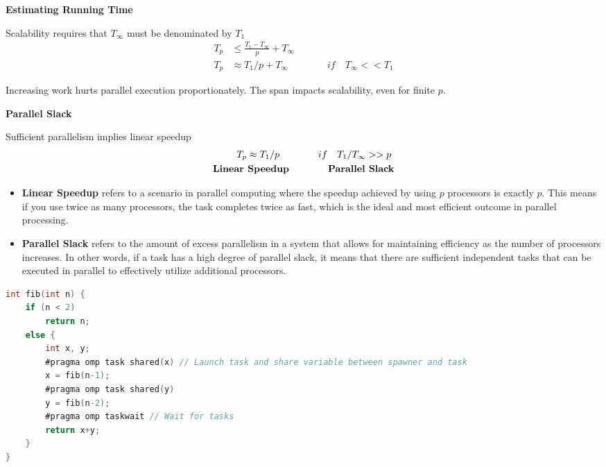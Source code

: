 %
\clearpage
%
\par {\Large \textbf{Estimating Running Time}}
\par Scalability requires that $T_\infty$ must be denominated by $T_1$
\begin{align*}
    T_p &\leq \frac{T_1 - T_\infty}{p} + T_\infty \\
    T_p &\approx T_1/p+T_\infty \qquad \qquad if \quad T_\infty << T_1
\end{align*}
\par Increasing work hurts parallel execution proportionately. The span impacts scalability, even for finite $p$.
\par {\Large \textbf{Parallel Slack}}
\par Sufficient parallelism implies linear speedup
\begin{align*}
    T_p \approx T_1 /p \qquad \qquad &if \quad T_1/T_\infty >> p \\
    \text{\textbf{Linear Speedup}} \quad \qquad & \quad \text{\textbf{Parallel Slack}}
\end{align*}
\begin{itemize}
    \item \textbf{Linear Speedup} refers to a scenario in parallel computing where the speedup achieved by using $p$ processors is exactly $p$. This means if you use twice as many processors, the task completes twice as fast, which is the ideal and most efficient outcome in parallel processing.
    \item \textbf{Parallel Slack} refers to the amount of excess parallelism in a system that allows for maintaining efficiency as the number of processors increases. In other words, if a task has a high degree of parallel slack, it means that there are sufficient independent tasks that can be executed in parallel to effectively utilize additional processors. %
\end{itemize}
\begin{tcolorbox}[colback=nightblue!5!white, colframe=nightblue!75!black, title= OpenMP $fib()$ implementation]
    \begin{lstlisting}[label={lst:fibimpl1}, language=C, morekeywords={pragma, omp, task, shared, taskwait}]int fib(int n) {
    if (n < 2)
        return n;
    else {
        int x, y;
        #pragma omp task shared(x) // Launch task and share variable between spawner and task
        x = fib(n-1);
        #pragma omp task shared(y)
        y = fib(n-2);
        #pragma omp taskwait // Wait for tasks
        return x+y;
    }
}
    \end{lstlisting}
\end{tcolorbox}

